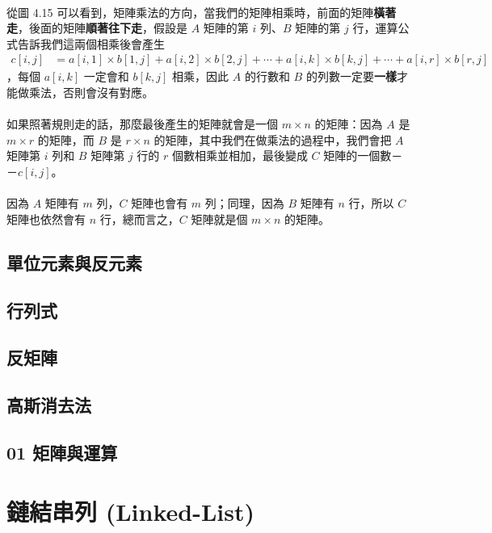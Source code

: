 \documentclass[12pt,a4paper,oneside]{report}
\begin{document}
\begin{CJK}{UTF8}{bkai}
\paragraph{}從圖 4.15 可以看到，矩陣乘法的方向，當我們的矩陣相乘時，前面的矩陣\textbf{橫著走}，後面的矩陣\textbf{順著往下走}，假設是 $A$ 矩陣的第 $i$ 列、$B$ 矩陣的第 $j$ 行，運算公式告訴我們這兩個相乘後會產生
\begin{align*}
c[i,j] &= a[i,1]\times{b[1,j]}+a[i,2]\times{b[2,j]}+\cdots{}+a[i,k]\times{b[k,j]}+\cdots{}+a[i,r]\times{b[r, j]}
\end{align*}
，每個 $a[i,k]$ 一定會和 $b[k,j]$ 相乘，因此 $A$ 的行數和 $B$ 的列數一定要\textbf{一樣}才能做乘法，否則會沒有對應。

\paragraph{}如果照著規則走的話，那麼最後產生的矩陣就會是一個 $m\times{n}$ 的矩陣：因為 $A$ 是 $m\times{r}$ 的矩陣，而 $B$ 是 $r\times{n}$ 的矩陣，其中我們在做乘法的過程中，我們會把 $A$ 矩陣第 $i$ 列和 $B$ 矩陣第 $j$ 行的 $r$ 個數相乘並相加，最後變成 $C$ 矩陣的一個數－－$c[i,j]$。

\paragraph{}因為 $A$ 矩陣有 $m$ 列，$C$ 矩陣也會有 $m$ 列；同理，因為 $B$ 矩陣有 $n$ 行，所以 $C$ 矩陣也依然會有 $n$ 行，總而言之，$C$ 矩陣就是個 $m\times{n}$ 的矩陣。

\subsection{單位元素與反元素}
\subsection{行列式}
\subsection{反矩陣}
\subsection{高斯消去法}
\subsection{01 矩陣與運算}
\section{鏈結串列 (Linked-List)}

\end{CJK}
\end{document}
